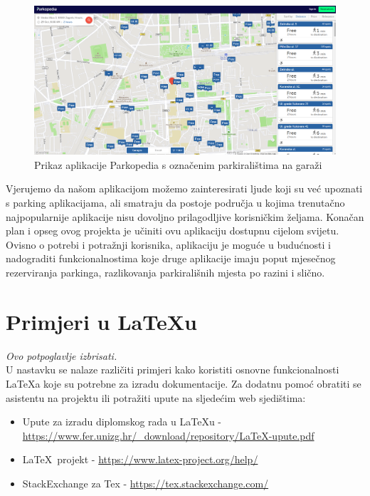 		\begin{figure}[H]
			\includegraphics[width=\textwidth]{slike/parkopedia_garage.PNG} %
			\caption{Prikaz aplikacije Parkopedia s označenim parkiralištima na garaži}
			\label{fig:promjene5} %
		\end{figure}
		
		Vjerujemo da našom aplikacijom možemo zainteresirati ljude koji su već upoznati s parking aplikacijama, ali smatraju da postoje područja u kojima trenutačno najpopularnije aplikacije nisu dovoljno prilagodljive korisničkim željama. Konačan plan i opseg ovog projekta je učiniti ovu aplikaciju dostupnu cijelom svijetu. Ovisno o potrebi i potražnji korisnika, aplikaciju je moguće u budućnosti i nadograditi funkcionalnostima koje druge aplikacije imaju poput mjesečnog rezerviranja parkinga, razlikovanja parkirališnih mjesta po razini i slično.
		
		\section{Primjeri u \LaTeX u}
		
		\textit{Ovo potpoglavlje izbrisati.}\\

		U nastavku se nalaze različiti primjeri kako koristiti osnovne funkcionalnosti \LaTeX a koje su potrebne za izradu dokumentacije. Za dodatnu pomoć obratiti se asistentu na projektu ili potražiti upute na sljedećim web sjedištima:
		\begin{itemize}
			\item Upute za izradu diplomskog rada u \LaTeX u - \url{https://www.fer.unizg.hr/_download/repository/LaTeX-upute.pdf}
			\item \LaTeX\ projekt - \url{https://www.latex-project.org/help/}
			\item StackExchange za Tex - \url{https://tex.stackexchange.com/}\\
		
		\end{itemize} 	


